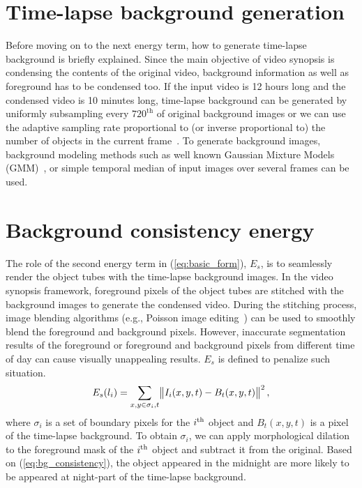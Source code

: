 \documentclass[11pt]{hyu_thesis}
\begin{document}
\section{Time-lapse background generation}
Before moving on to the next energy term, how to generate time-lapse background is briefly explained. Since the main objective of video synopsis is condensing the contents of the original video, background information as well as foreground has to be condensed too. If the input video is 12 hours long and the condensed video is 10 minutes long, time-lapse background can be generated by uniformly subsampling every $720^\textrm{th}$ of original background images or we can use the adaptive sampling rate proportional to (or inverse proportional to) the number of objects in the current frame~\cite{Pritch2008}. To generate background images, background modeling methods such as well known Gaussian Mixture Models (GMM)~\cite{Stauffer1999,Zivkovic2004,Zivkovic2006}, or simple temporal median of input images over several frames can be used. %

\section{Background consistency energy}
The role of the second energy term in (\ref{eq:basic_form}), $E_s$, is to seamlessly render the object tubes with the time-lapse background images. In the video synopsis framework, foreground pixels of the object tubes are stitched with the background images to generate the condensed video. During the stitching process, image blending algorithms (e.g., Poisson image editing~\cite{Perez2003}) can be used to smoothly blend the foreground and background pixels. However, inaccurate segmentation results of the foreground or foreground and background pixels from different time of day can cause visually unappealing results.%
$E_s$ is defined to penalize such situation.
\begin{equation}
\label{eq:bg_consistency}
E_s(l_i)=\sum_{x,y \in \sigma_i,t}\norm{I_i(x,y,t)-B_t(x,y,t)}^2,
\end{equation}
where $\sigma_i$ is a set of boundary pixels for the $i^{\rm{th}}$ object and $B_t(x,y,t)$ is a pixel of the time-lapse background. To obtain $\sigma_i$, we can apply morphological dilation to the foreground mask of the $i^{\rm{th}}$ object and subtract it from the original. Based on (\ref{eq:bg_consistency}), the object appeared in the midnight are more likely to be appeared at night-part of the time-lapse background.
\end{document}
